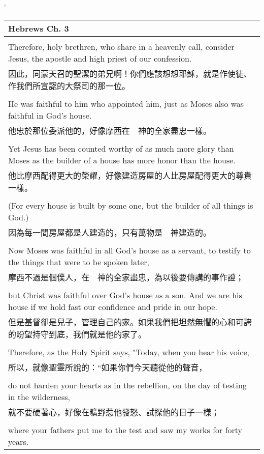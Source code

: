 \newpage
`
\begin{tabularx}{\textwidth}{p{}}
\hline
Hebrews Ch. 3 \\
\hline \\
Therefore, holy brethren, who share in a heavenly call, consider Jesus, the apostle and high priest of our confession. \\
因此，同蒙天召的聖潔的弟兄啊！你們應該想想耶穌，就是作使徒、作我們所宣認的大祭司的那一位。 \\ \\
He was faithful to him who appointed him, just as Moses also was faithful in God's house. \\
他忠於那位委派他的，好像摩西在　神的全家盡忠一樣。 \\ \\
Yet Jesus has been counted worthy of as much more glory than Moses as the builder of a house has more honor than the house. \\
他比摩西配得更大的榮耀，好像建造房屋的人比房屋配得更大的尊貴一樣。 \\ \\
(For every house is built by some one, but the builder of all things is God.) \\
因為每一間房屋都是人建造的，只有萬物是　神建造的。 \\ \\
Now Moses was faithful in all God's house as a servant, to testify to the things that were to be spoken later, \\
摩西不過是個僕人，在　神的全家盡忠，為以後要傳講的事作證； \\ \\
but Christ was faithful over God's house as a son. And we are his house if we hold fast our confidence and pride in our hope. \\
但是基督卻是兒子，管理自己的家。如果我們把坦然無懼的心和可誇的盼望持守到底，我們就是他的家了。 \\ \\
Therefore, as the Holy Spirit says, "Today, when you hear his voice, \\
所以，就像聖靈所說的：“如果你們今天聽從他的聲音， \\ \\
do not harden your hearts as in the rebellion, on the day of testing in the wilderness, \\
就不要硬著心，好像在曠野惹他發怒、試探他的日子一樣； \\ \\
where your fathers put me to the test and saw my works for forty years. \\

\end{tabularx}
